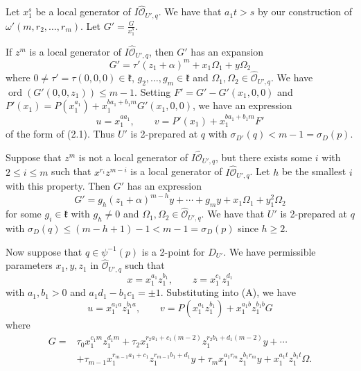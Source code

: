 \documentclass[11pt]{article}
\newcommand{\fk}{\mathfrak{k}}                 %
\newcommand{\OH}{\widehat{\mathcal{O}}}        %
\newcommand{\ord}{\operatorname{ord}}
\begin{document}
Let $x_1^s$ be a local generator of $I\OH_{U',q}$. We have that $a_1 t > s$ by our construction
of $\omega'(m, r_2, \dots, r_m)$. Let $G' = \frac{G}{x_1^s}$.

If $z^m$ is a local generator of $I\OH_{U',q}$, then $G'$ has an expansion
\[
G' = \tau' (z_1 + \alpha)^m + x_1 \Omega_1 + y \Omega_2
\]
where $0 \neq \tau' = \tau(0, 0, 0) \in \fk$, $g_2, \dots, g_m \in \fk$ and
$\Omega_1, \Omega_2 \in \OH_{U',q}$. We have $\ord(G'(0, 0, z_1)) \leqslant m - 1$.
Setting $F' = G' - G'(x_1, 0, 0)$ and $P'(x_1) = P(x_1^{a_1}) + x_1^{b a_1 + b_1 m}
G'(x_1, 0, 0)$, we have an expression
\[
u = x_1^{a a_1}, \qquad v = P'(x_1) + x_1^{b a_1 + b_1 m} F'
\]
of the form of (2.1). Thus $U'$ is 2-prepared at $q$ with $\sigma_{D'}(q) < m - 1 =
\sigma_D(p)$.


Suppose that $z^m$ is not a local generator of $I\OH_{U',q}$, but there exists some $i$
with $2 \leqslant i \leqslant m$ such that $x^{r_i} z^{m-i}$ is a local generator of
$I\OH_{U',q}$. Let $h$ be the smallest $i$ with this property. Then $G'$ has an
expression
\[
G' = g_h (z_1 + \alpha)^{m-h} y + \cdots + g_m y + x_1 \Omega_1 + y_1^2 \Omega_2
\]
for some $g_i \in \fk$ with $g_h \neq 0$ and $\Omega_1, \Omega_2 \in \OH_{U',q}$. We have
that $U'$ is 2-prepared at $q$ with $\sigma_D(q) \leqslant (m - h + 1) - 1 < m - 1 =
\sigma_D(p)$ since $h \geqslant 2$.

Now suppose that $q \in \psi^{-1}(p)$ is a 2-point for $D_{U'}$. We have permissible
parameters $x_1, y, z_1$ in $\OH_{U',q}$ such that
\begin{equation}
\tag{c15}
x = x_1^{a_1} z_1^{b_1}, \qquad z = x_1^{c_1} z_1^{d_1}
\end{equation}
with $a_1, b_1 > 0$ and $a_1 d_1 - b_1 c_1 = \pm 1$. Substituting into (A), we have
\[
u = x_1^{a_1 a} z_1^{b_1 a}, \qquad v = P(x_1^{a_1} z_1^{b_1}) + x_1^{a_1 b} z_1^{b_1 b} G
\]
where
\begin{align*}
G = {} & \tau_0 x_1^{c_1 m} z_1^{d_1 m} + \tau_2 x_1^{r_2 a_1 + c_1 (m-2)} z_1^{r_2 b_1 + d_1 (m-2)} y + \cdots \\
       & + \tau_{m-1} x_1^{r_{m-1} a_1 + c_1} z_1^{r_{m-1} b_1 + d_1} y + \tau_m x_1^{a_1 r_m} z_1^{b_1 r_m} y + x_1^{a_1 t} z_1^{b_1 t} \Omega .
\end{align*}
\end{document}
